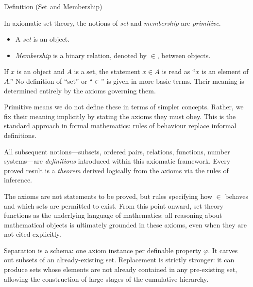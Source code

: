 \NoLocalDependencies

\begin{definitionbox}{Definition (Set and Membership)}
\begin{definition}\label{def:set-membership}
In axiomatic set theory, the notions of \emph{set} and \emph{membership} are
\emph{primitive}.

\begin{itemize}
  \item A \emph{set} is an object.
  \item \emph{Membership} is a binary relation, denoted by $\in$, between objects.
\end{itemize}

If $x$ is an object and $A$ is a set, the statement $x \in A$ is read as
``$x$ is an element of $A$.'' No definition of ``set'' or ``$\in$'' is given
in more basic terms. Their meaning is determined entirely by the axioms
governing them.
\end{definition}
\end{definitionbox}

\begin{remark*}
Primitive means we do not define these in terms of simpler concepts.
Rather, we fix their meaning implicitly by stating the axioms they must obey.
This is the standard approach in formal mathematics: rules of behaviour replace
informal definitions.
\end{remark*}

\begin{remark*}[Consequence]
All subsequent notions---subsets, ordered pairs, relations, functions,
number systems---are \emph{definitions} introduced within this axiomatic
framework. Every proved result is a \emph{theorem} derived logically from the
axioms via the rules of inference.
\end{remark*}

\begin{remark*}
The axioms are not statements to be proved, but rules specifying how $\in$
behaves and which sets are permitted to exist. From this point onward, set
theory functions as the underlying language of mathematics: all reasoning
about mathematical objects is ultimately grounded in these axioms, even when
they are not cited explicitly.
\end{remark*}

\DefinitionalRoot

\begin{remark*}
Separation is a schema: one axiom instance per definable property $\varphi$.
It carves out subsets of an already-existing set. Replacement is strictly
stronger: it can produce sets whose elements are not already contained in any
pre-existing set, allowing the construction of large stages of the cumulative
hierarchy.
\end{remark*}

